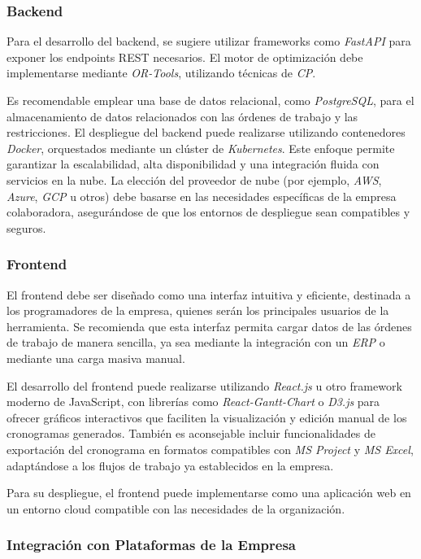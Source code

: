 \documentclass{article}
\begin{document}
\subsubsection{Backend}

Para el desarrollo del backend, se sugiere utilizar frameworks como \textit{FastAPI} para exponer los endpoints REST necesarios. El motor de optimización debe implementarse mediante \textit{OR-Tools}, utilizando técnicas de \textit{CP}.

Es recomendable emplear una base de datos relacional, como \textit{PostgreSQL}, para el almacenamiento de datos relacionados con las órdenes de trabajo y las restricciones. El despliegue del backend puede realizarse utilizando contenedores \textit{Docker}, orquestados mediante un clúster de \textit{Kubernetes}. Este enfoque permite garantizar la escalabilidad, alta disponibilidad y una integración fluida con servicios en la nube. La elección del proveedor de nube (por ejemplo, \textit{AWS}, \textit{Azure}, \textit{GCP} u otros) debe basarse en las necesidades específicas de la empresa colaboradora, asegurándose de que los entornos de despliegue sean compatibles y seguros.

\subsubsection{Frontend}

El frontend debe ser diseñado como una interfaz intuitiva y eficiente, destinada a los programadores de la empresa, quienes serán los principales usuarios de la herramienta. Se recomienda que esta interfaz permita cargar datos de las órdenes de trabajo de manera sencilla, ya sea mediante la integración con un \textit{ERP} o mediante una carga masiva manual.

El desarrollo del frontend puede realizarse utilizando \textit{React.js} u otro framework moderno de JavaScript, con librerías como \textit{React-Gantt-Chart} o \textit{D3.js} para ofrecer gráficos interactivos que faciliten la visualización y edición manual de los cronogramas generados. También es aconsejable incluir funcionalidades de exportación del cronograma en formatos compatibles con \textit{MS Project} y \textit{MS Excel}, adaptándose a los flujos de trabajo ya establecidos en la empresa.

Para su despliegue, el frontend puede implementarse como una aplicación web en un entorno cloud compatible con las necesidades de la organización.

\subsubsection{Integración con Plataformas de la Empresa}
\end{document}
